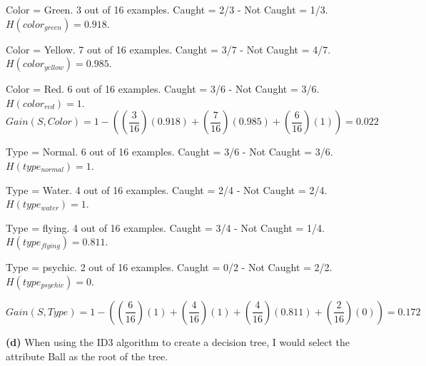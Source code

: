 \documentclass[11pt]{article}
\renewcommand\part[1]{\vspace{.10in}\textbf{(#1)}}
\begin{document}
 \par

Color = Green. 3 out of 16 examples. Caught = 2/3 - Not Caught = 1/3. $H(color_{green}) = 0.918$.

Color = Yellow. 7 out of 16 examples. Caught = 3/7 - Not Caught = 4/7. $H(color_{yellow}) = 0.985$.

Color = Red. 6 out of 16 examples. Caught = 3/6 - Not Caught = 3/6. $H(color_{red}) = 1$.
$$Gain(S, Color) = 1 - ((\frac{3}{16})(0.918) + (\frac{7}{16})(0.985) + (\frac{6}{16})(1)) = 0.022$$

 \par 

Type = Normal. 6 out of 16 examples. Caught = 3/6 - Not Caught = 3/6. $H(type_{normal}) = 1$.

Type = Water. 4 out of 16 examples. Caught = 2/4 - Not Caught = 2/4. $H(type_{water}) = 1$.

Type = flying. 4 out of 16 examples. Caught = 3/4 - Not Caught = 1/4. $H(type_{flying}) = 0.811$.

Type = psychic. 2 out of 16 examples. Caught = 0/2 - Not Caught = 2/2. $H(type_{psychic}) = 0$.

$$Gain(S, Type) = 1 - ((\frac{6}{16})(1) + (\frac{4}{16})(1) + (\frac{4}{16})(0.811) + (\frac{2}{16})(0)) = 0.172$$

 \par 

\part{d} When using the ID3 algorithm to create a decision tree, I would select the attribute Ball as the root of the tree.

\setlength{\fboxsep}{4pt}
 \par 
\end{document}
